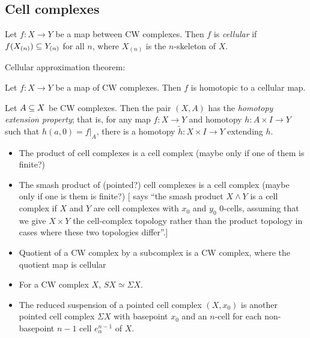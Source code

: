 \documentclass{MetricNotes2023}
\def\subq{\ensuremath\subseteq}
\begin{document}
\subsection{Cell complexes}\label{2502141508}

\begin{definition}
Let \(f : X \to Y\) be a map between CW complexes. Then \(f\) is \textit{cellular} if \(f(X_{(n)})\subq Y_{(n)}\) for all \(n\), where \(X_{(n)}\) is the \(n\)-skeleton of \(X\). 
\end{definition}

Cellular approximation theorem:

\begin{theorem}\label{2502211420}
Let \(f : X \to Y\) be a map of CW complexes. Then \(f\) is homotopic to a cellular map.
\end{theorem}

\begin{lemma}\label{2502211419}
Let \(A\subq X\) be CW complexes. Then the pair \((X, A)\) has the \textit{homotopy extension property}; that is, for any map \(f : X \to Y\) and homotopy \(h : A\times I \to Y\) such that \(h(a,0)=f|_A\), there is a homotopy \(\tilde h : X\times I \to Y\) extending \(h\). 
\end{lemma}

\begin{itemize}
\item The product of cell complexes is a cell complex (maybe only if one of them is finite?)
\item The smash product of (pointed?) cell complexes is a cell complex (maybe only if one is them is finite?) [\autocite{hatcher} says ``the smash product \(X\wedge Y\) is a cell complex if \(X\) and \(Y\) are cell complexes with \(x_0\) and \(y_0\) \(0\)-cells, assuming that we give \(X\times Y\) the cell-complex topology rather than the product topology in cases where these two topologies differ''.]
\item Quotient of a CW complex by a subcomplex is a CW complex, where the quotient map is cellular
\item For a CW complex \(X\), \(SX\simeq \Sigma X\).
\item The reduced suspension of a pointed cell complex \((X, x_0)\) is another pointed cell complex \(\Sigma X\) with basepoint \(x_0\) and an \(n\)-cell for each non-basepoint \(n-1\) cell \(e^{n-1}_\alpha\) of \(X\).
\end{itemize}
\end{document}
